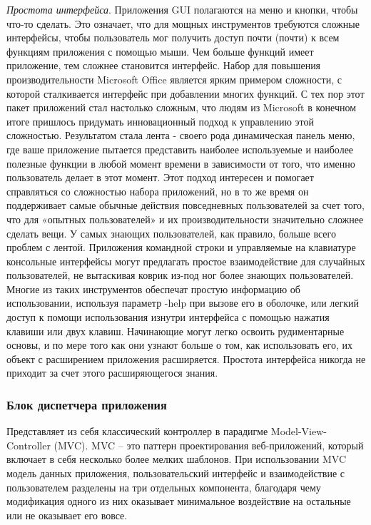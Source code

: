\textit{Простота интерфейса}. Приложения GUI полагаются на меню и кнопки, чтобы что-то сделать. Это означает, что для мощных инструментов требуются сложные интерфейсы, чтобы пользователь мог получить доступ почти (почти) к всем функциям приложения с помощью мыши. Чем больше функций имеет приложение, тем сложнее становится интерфейс. Набор для повышения производительности Microsoft Office является ярким примером сложности, с которой сталкивается интерфейс при добавлении многих функций. С тех пор этот пакет приложений стал настолько сложным, что людям из Microsoft в конечном итоге пришлось придумать инновационный подход к управлению этой сложностью. Результатом стала лента - своего рода динамическая панель меню, где ваше приложение пытается представить наиболее используемые и наиболее полезные функции в любой момент времени в зависимости от того, что именно пользователь делает в этот момент. Этот подход интересен и помогает справляться со сложностью набора приложений, но в то же время он поддерживает самые обычные действия повседневных пользователей за счет того, что для «опытных пользователей» и их производительности значительно сложнее сделать вещи. У самых знающих пользователей, как правило, больше всего проблем с лентой. Приложения командной строки и управляемые на клавиатуре консольные интерфейсы могут предлагать простое взаимодействие для случайных пользователей, не вытаскивая коврик из-под ног более знающих пользователей. Многие из таких инструментов обеспечат простую информацию об использовании, используя параметр -help при вызове его в оболочке, или легкий доступ к помощи использования изнутри интерфейса с помощью нажатия клавиши или двух клавиш. Начинающие могут легко освоить рудиментарные основы, и по мере того как они узнают больше о том, как использовать его, их объект с расширением приложения расширяется. Простота интерфейса никогда не приходит за счет этого расширяющегося знания.


\subsubsection{Блок диспетчера приложения }

Представляет из себя классический контроллер в парадигме Model-View-Controller (MVC).  MVC – это паттерн проектирования веб-приложений, который включает в себя несколько более мелких шаблонов. При использовании MVC модель данных приложения, пользовательский интерфейс и взаимодействие с пользователем разделены на три отдельных компонента, благодаря чему модификация одного из них оказывает минимальное воздействие на остальные или не оказывает его вовсе.

